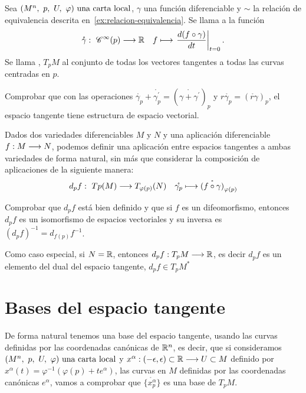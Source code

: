 \begin{definition}
  Sea $(M^n,\ p,\ U,\ \varphi)\textmd{ una carta local}$, $\gamma$ una función diferenciable y $\sim$ la relación de equivalencia
  descrita en~\ref{ex:relacion-equivalencia}.
  Se llama  a la
  función
  \begin{equation}
    \label{eq:vector-tangente-curva}
      \mathring{\gamma}:\ \mathscr{C}^\infty(p) \longrightarrow \mathbb{R} \quad f \longmapsto \left.\frac{d(f\circ\gamma)}{dt}\right|_{t=0}.
  \end{equation}
  Se llama , $T_pM$ al
  conjunto de todas los vectores tangentes a todas las curvas centradas en $p$.
\end{definition}

\begin{exercise}
  Comprobar que con las operaciones $\mathring{\gamma_p}+\mathring{\gamma_p^\prime}=
  (\mathring{\gamma+\gamma^\prime})_p$ y $r\mathring{\gamma_p}=(\mathring{r\gamma})_p$, el espacio
  tangente tiene estructura de espacio vectorial.
\end{exercise}

Dados dos variedades diferenciables $M$ y $N$ y una aplicación diferenciable $f:M\longrightarrow N$,
podemos definir una aplicación entre espacios tangentes a ambas variedades de forma natural, sin
más que considerar la composición de aplicaciones de la siguiente manera:
\begin{equation}
  \label{eq:diferencial-aplicacion}
    d_pf:\ Tp(M) \longrightarrow T_{\varphi(p)}(N) \quad \mathring{\gamma_p} \longmapsto \mathring{(f\circ\gamma)
    }_{\varphi
    (p)}
\end{equation}

\begin{exercise}
  Comprobar que $d_pf$ está bien definido y que si $f$ es un difeomorfismo, entonces $d_pf$ es
  un isomorfismo de espacios vectoriales y su inversa es $(d_pf)^{-1}=d_{f(p)}f^{-1}$.
\end{exercise}

Como caso especial, si $N=\mathbb{R}$, entonces $d_pf:T_pM\longrightarrow \mathbb{R}$, es decir $d_p f$ es un
elemento del dual del espacio tangente, $d_p f\in T_pM^*$


\section{Bases del espacio tangente}\label{sec:bases-del-espacio-tangente}
De forma natural tenemos una base del espacio tangente, usando las curvas definidas por las
coordenadas canónicas de $\mathbb{R}^n$, es decir, que si consideramos $(M^n,\ p,\ U,\ \varphi)\textmd{ una carta local}$ y $x^\alpha:(-\epsilon, \epsilon)\subset\mathbb{R}\longrightarrow U\subset M$ definido por $x^\alpha(t)=\varphi^{-1}(\varphi(p)+te^\alpha)$, las curvas en $M$
definidas por las coordenadas canónicas $e^\alpha$,
vamos a comprobar que $\{\mathring{x_p^\alpha}\}$ es una base de $T_pM$.

